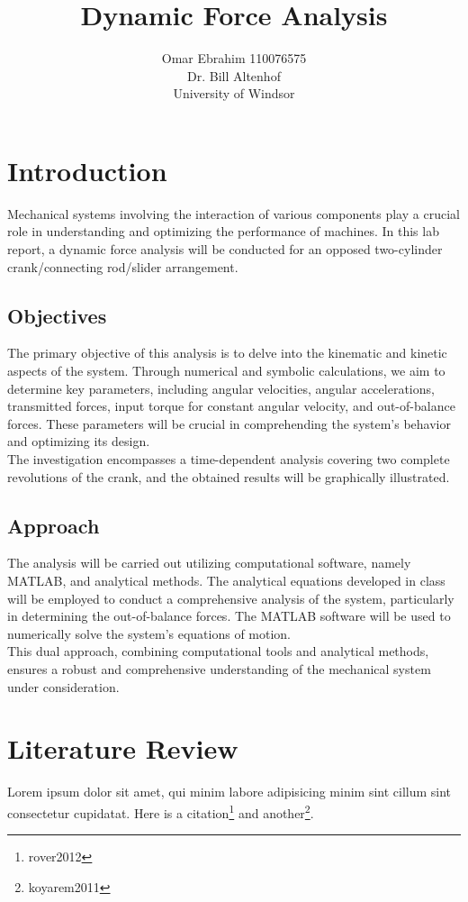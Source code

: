 \documentclass[12pt, titlepage]{article}
\title{Dynamic Force Analysis}
\author{Omar Ebrahim 110076575\\Dr. Bill Altenhof\\ University of Windsor}
\begin{document}
\maketitle
\newpage
\tableofcontents
\listoffigures
\listoftables
\thispagestyle{tocstyle}
\newpage
\section{Introduction}
Mechanical systems involving the interaction of various components play a
crucial role in understanding and optimizing the performance of machines. In
this lab report, a dynamic force analysis will be conducted for an opposed
two-cylinder crank/connecting rod/slider arrangement. 
\subsection{Objectives}
The primary objective of this analysis is to delve into the kinematic and
kinetic aspects of the system. Through numerical and symbolic calculations, we
aim to determine key parameters, including angular velocities, angular
accelerations, transmitted forces, input torque for constant angular velocity,
and out-of-balance forces. These parameters will be crucial in comprehending
the system's behavior and optimizing its design.\\[10pt]
The investigation encompasses a time-dependent analysis covering two complete
revolutions of the crank, and the obtained results will be graphically
illustrated.
\subsection{Approach}
The analysis will be carried out utilizing computational
software, namely MATLAB, and analytical methods. The analytical equations
developed in class will be employed to conduct a comprehensive analysis of the
system, particularly in determining the out-of-balance forces. The MATLAB
software will be used to numerically solve the system's equations of motion.\\[10pt]
This dual approach, combining computational tools and analytical methods,
ensures a robust and comprehensive understanding of the mechanical system under
consideration.
\newpage
\section{Literature Review}
Lorem ipsum dolor sit amet, qui minim labore adipisicing minim sint cillum sint
consectetur cupidatat.
Here is a citation\footnote{rover2012} and another\footnote{koyarem2011}.
\newpage
\end{document}
